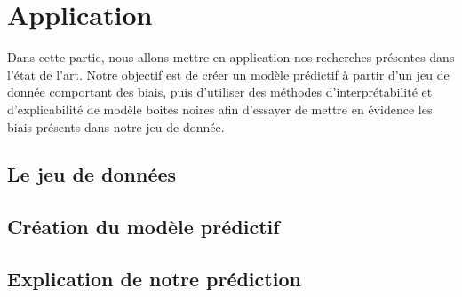 \chapter{Application}
Dans cette partie, nous allons mettre en application nos recherches présentes dans l'état de l'art. Notre objectif est de créer un modèle prédictif à partir d'un jeu de donnée comportant des biais, puis d'utiliser des méthodes d'interprétabilité et d'explicabilité de modèle boites noires afin d'essayer de mettre en évidence les biais présents dans notre jeu de donnée.
\section{Le jeu de données}
\section{Création du modèle prédictif}
\section{Explication de notre prédiction}